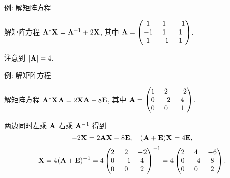\begin{frame}{例: 解矩阵方程}
	\onslide<+->
	\begin{example}
		解矩阵方程 ${\mathbf{A}}^*{\mathbf{X}}={\mathbf{A}}^{-1}+2{\mathbf{X}}$, 其中 ${\mathbf{A}}=\begin{pmatrix}
			1&1&-1\\-1&1&1\\1&-1&1
		\end{pmatrix}$.
	\end{example}
	\onslide<+->
	\begin{solution}
		注意到 $|{\mathbf{A}}|=4$.
		\onslide<+->{因此
		\[\bfX=(4\bfE-2\bfA)^{-1}=\begin{pmatrix}
			2&-2&2\\2&2&-2\\-2&2&2
		\end{pmatrix}^{-1}=\frac14\begin{pmatrix}
			1&1&0\\0&1&1\\1&0&1
		\end{pmatrix}.\]}
		\vspace{-\baselineskip}
	\end{solution}
\end{frame}


\begin{frame}{例: 解矩阵方程}
	\onslide<+->
	\begin{exercise}
		解矩阵方程 ${\mathbf{A}}^*{\mathbf{X}}{\mathbf{A}}=2{\mathbf{X}}{\mathbf{A}}-8{\mathbf{E}}$, 其中 ${\mathbf{A}}=\begin{pmatrix}
			1&2&-2\\0&-2&4\\0&0&1
		\end{pmatrix}$.
	\end{exercise}
	\onslide<+->
	\begin{answer}
		两边同时左乘 ${\mathbf{A}}$ 右乘 ${\mathbf{A}}^{-1}$ 得到
		\[-2{\mathbf{X}}=2{\mathbf{A}}{\mathbf{X}}-8{\mathbf{E}},\quad ({\mathbf{A}}+{\mathbf{E}}){\mathbf{X}}=4{\mathbf{E}},\]
		\[{\mathbf{X}}=4({\mathbf{A}}+{\mathbf{E}})^{-1}=4\begin{pmatrix}
			2&2&-2\\0&-1&4\\0&0&2
		\end{pmatrix}^{-1}=4\begin{pmatrix}
			2&4&-6\\0&-4&8\\0&0&2
		\end{pmatrix}.\]
	\end{answer}
\end{frame}


